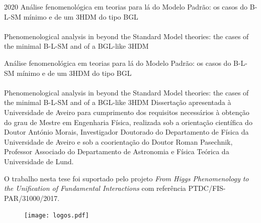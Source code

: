 \documentclass[10pt]{report}
\def\ThesisYear{2020}
\renewcommand{\(}{\left(}
\renewcommand{\)}{\right)}
\renewcommand{\[}{\left[}
\renewcommand{\]}{\right]}
\begin{document}
\TitlePage
%	
  {\ThesisYear}
        {Análise fenomenológica em teorias para lá do Modelo Padrão: os casos do B-L-SM mínimo e de um 3HDM do tipo BGL \\ \ \\ Phenomenological analysis in beyond the Standard Model theories: the cases of the minimal B-L-SM and of a BGL-like 3HDM}
\EndTitlePage
\titlepage\ \endtitlepage %

\TitlePage
  \HEADER{\BAR}{\ThesisYear}
        {Análise fenomenológica em teorias para lá do Modelo Padrão: os casos do B-L-SM mínimo e de um 3HDM do tipo BGL \\ \ \\ Phenomenological analysis in beyond the Standard Model theories: the cases of the minimal B-L-SM and of a BGL-like 3HDM}
  \vspace*{15mm}
  \TEXT{}
       {Dissertação apresentada à Universidade de Aveiro para cumprimento dos requisitos necessários à obtenção do grau de Mestre em Engenharia Física, realizada sob a orientação científica do Doutor António Morais, Investigador Doutorado do Departamento de Física da Universidade de Aveiro e sob a coorientação do Doutor Roman Pasechnik, Professor Associado do Departamento de Astronomia e Física Teórica da Universidade de Lund.}
    \vfill 
	\begin{center}
		\hspace{-2cm}
		\TEXT{}
		{O trabalho nesta tese foi suportado pelo projeto \textit{From Higgs Phenomenology to the Unification of Fundamental Interactions} com referência PTDC/FIS-PAR/31000/2017.}
		\begin{figure}[h]
			\hspace{7.3cm}
			\texttt{[image: logos.pdf]}
		\end{figure}
	\end{center}
\EndTitlePage
\titlepage\ \endtitlepage %
\end{document}
